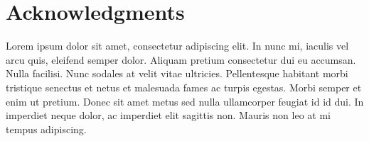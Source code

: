 
\chapter*{Acknowledgments}

Lorem ipsum dolor sit amet, consectetur adipiscing elit. In nunc mi, iaculis vel arcu quis, eleifend semper dolor. Aliquam pretium consectetur dui eu accumsan. Nulla facilisi. Nunc sodales at velit vitae ultricies. Pellentesque habitant morbi tristique senectus et netus et malesuada fames ac turpis egestas. Morbi semper et enim ut pretium. Donec sit amet metus sed nulla ullamcorper feugiat id id dui. In imperdiet neque dolor, ac imperdiet elit sagittis non. Mauris non leo at mi tempus adipiscing.
